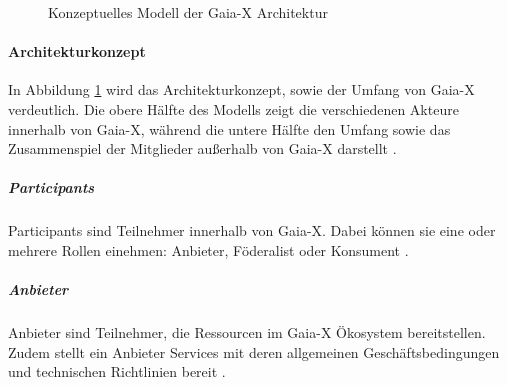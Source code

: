 \begin{figure}[h]
  \centering
  \caption{Konzeptuelles Modell der Gaia-X Architektur}
  \label{fig:gaia-x-concept-architecture}
\end{figure}

\paragraph{Architekturkonzept}
In Abbildung \ref{fig:gaia-x-concept-architecture} wird das Architekturkonzept, sowie der Umfang von Gaia-X verdeutlich.
Die obere Hälfte des Modells zeigt die verschiedenen Akteure innerhalb von Gaia-X, während die
untere Hälfte den Umfang sowie das Zusammenspiel der Mitglieder außerhalb von Gaia-X darstellt \cite{GaiaXArchitecture2021}.

\subparagraph{Participants}
Participants sind Teilnehmer innerhalb von Gaia-X. 
Dabei können sie eine oder mehrere Rollen einehmen: Anbieter, Föderalist oder Konsument \cite{GaiaXArchitecture2021}.

\subparagraph{Anbieter}
Anbieter sind Teilnehmer, die Ressourcen im Gaia-X Ökosystem bereitstellen. Zudem stellt
ein Anbieter Services mit deren allgemeinen Geschäftsbedingungen und technischen Richtlinien bereit \cite{GaiaXArchitecture2021}.

